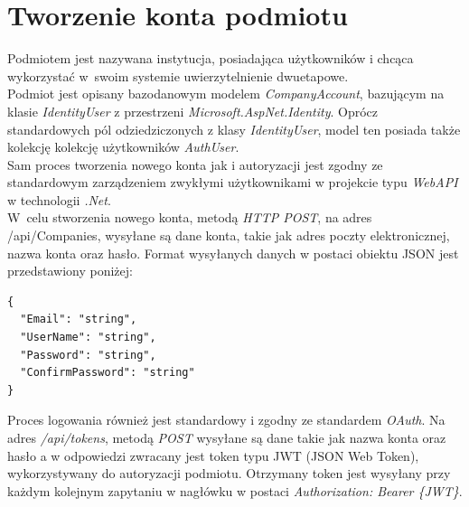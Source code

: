 \section{Tworzenie konta podmiotu}
Podmiotem jest nazywana instytucja, posiadająca użytkowników i chcąca wykorzystać w~swoim systemie 
uwierzytelnienie dwuetapowe. \\
Podmiot jest opisany bazodanowym modelem \textit{CompanyAccount}, bazującym na klasie \textit{IdentityUser}
z przestrzeni \textit{Microsoft.AspNet.Identity}.
Oprócz standardowych pól odziedziczonych z klasy \textit{IdentityUser}, model ten posiada także kolekcję 
kolekcję użytkowników \textit{AuthUser}. \\
Sam proces tworzenia nowego konta jak i autoryzacji jest zgodny ze standardowym zarządzeniem zwykłymi użytkownikami
w projekcie typu \textit{WebAPI} w technologii \textit{.Net}. \\
W~celu stworzenia nowego konta, metodą \textit{HTTP POST}, na adres \mbox{/api/Companies}, wysyłane są dane konta, 
takie jak adres poczty elektronicznej, nazwa konta oraz hasło. 
Format wysyłanych danych w postaci obiektu JSON jest przedstawiony poniżej:
\begin{lstlisting}
{
  "Email": "string",
  "UserName": "string",
  "Password": "string",
  "ConfirmPassword": "string"
}
\end{lstlisting}
Proces logowania również jest standardowy i zgodny ze standardem \textit{OAuth}.
Na adres \textit{/api/tokens}, metodą \textit{POST} wysyłane są dane takie jak nazwa konta oraz hasło
a w odpowiedzi zwracany jest token typu JWT (JSON Web Token), wykorzystywany do autoryzacji podmiotu.
Otrzymany token jest wysyłany przy każdym kolejnym zapytaniu w nagłówku w postaci \textit{Authorization: Bearer \{JWT\}}.

